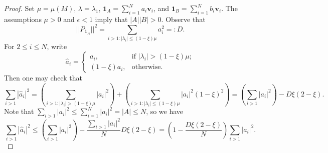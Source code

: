 \documentclass[10pt,a4paper]{amsart}
\numberwithin{equation}{section}
\def\v{\mathbf{v}}
\def\1{\mathbf{1}}
\begin{document}
\begin{proof}
Set $\mu=\mu(M)$, $\lambda=\lambda_1$, $\1_A=\sum_{i=1}^N a_i\v_i$, and $\1_B=\sum_{i=1}^N b_i\v_i$.
The assumptions $\mu>0$ and $\epsilon<1$ imply that $|A||B|>0$.
Observe that
$$ ||P_{\1_A}||^2=\sum_{i>1: |\lambda_i|\leq (1-\xi)\mu } a_i^2=:D.$$
For $2\leq i\leq N$, write
$$\widehat{a}_i=
\left\{
\begin{array}{ll}
a_i, &  \mbox{if~} |\lambda_i|>(1-\xi) \mu ;\\
(1-\xi)a_i, & \mbox{otherwise}.
\end{array}\right.$$
Then one may check that
$$\sum_{ i>1} |\widehat{a}_i|^2=
\left(\sum_{ i>1: |\lambda_i|>(1-\xi) \mu  }  |a_i|^2\right)+
\left(\sum_{ i>1: |\lambda_i|\leq(1-\xi) \mu  }  |a_i|^2 (1-\xi)^2\right)
=\left(\sum_{ i>1}|a_i|^2\right) - D \xi(2-\xi).$$
Note that $\sum_{ i>1}|a_i|^2 \leq \sum_{ i=1}^N|a_i|^2=|A|\leq N$,
so we have
\begin{equation}\label{Hfmanstabilityeq111}
\sum_{ i>1} |\widehat{a}_i|^2\leq \left(\sum_{ i>1}|a_i|^2\right) - \frac{\sum_{ i>1}|a_i|^2}{N} D \xi(2-\xi)=
\left(1-\frac{D \xi(2-\xi)}{N}\right)\sum_{ i>1}|a_i|^2.
\end{equation}



\end{proof}
\end{document}
